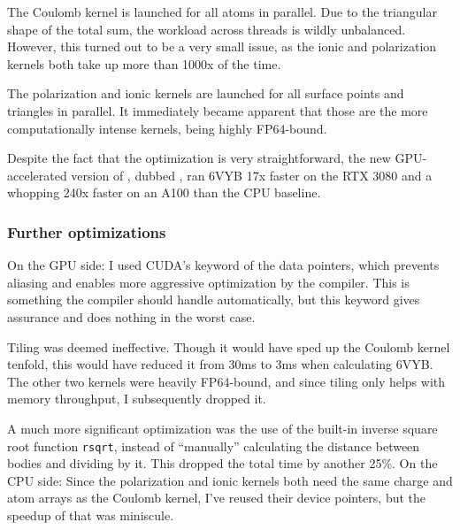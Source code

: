 The Coulomb kernel is launched for all atoms in parallel.
Due to the triangular shape of the total sum, the workload across threads is wildly unbalanced.
However, this turned out to be a very small issue, as the ionic and polarization kernels both take up more than 1000x of the time.

The polarization and ionic kernels are launched for all surface points and triangles in parallel.
It immediately became apparent that those are the more computationally intense kernels, being highly FP64-bound.

Despite the fact that the optimization is very straightforward, the new GPU-accelerated version of , dubbed , ran 6VYB 17x faster on the RTX 3080 and a whopping 240x faster on an A100 than the CPU baseline.

\subsubsection{Further optimizations}

On the GPU side:
I used CUDA's  keyword of the data pointers, which prevents aliasing and enables more aggressive optimization by the compiler.
This is something the compiler should handle automatically, but this keyword gives assurance and does nothing in the worst case.

Tiling was deemed ineffective.
Though it would have sped up the Coulomb kernel tenfold, this would have reduced it from 30ms to 3ms when calculating 6VYB.
The other two kernels were heavily FP64-bound,
and since tiling only helps with memory throughput, I subsequently dropped it.

A much more significant optimization was the use of the built-in inverse square root function \texttt{rsqrt}, instead of ``manually'' calculating the distance between bodies and dividing by it.
This dropped the total time by another 25\%.
\newline
\newline
On the CPU side: 
Since the polarization and ionic kernels both need the same charge and atom arrays as the Coulomb kernel, I've reused their device pointers, but the speedup of that was miniscule.

